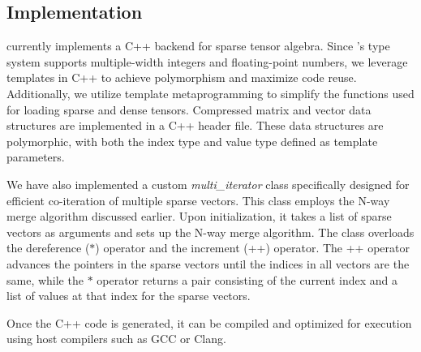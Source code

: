 \documentclass[acmsmall,nonacm]{acmart}\settopmatter{printfolios=true,printccs=false,printacmref=false}
\newcommand{\rhyme}{\text{Rhyme}\xspace}
\begin{document}
\subsection*{Implementation}

\rhyme currently implements a C++ backend for sparse tensor algebra. Since \rhyme's type system supports multiple-width integers and floating-point numbers, we leverage templates in C++ to achieve polymorphism and maximize code reuse. Additionally, we utilize template metaprogramming to simplify the functions used for loading sparse and dense tensors. Compressed matrix and vector data structures are implemented in a C++ header file. These data structures are polymorphic, with both the index type and value type defined as template parameters.\par
We have also implemented a custom \emph{multi\_iterator} class specifically designed for efficient co-iteration of multiple sparse vectors. This class employs the N-way merge algorithm discussed earlier. Upon initialization, it takes a list of sparse vectors as arguments and sets up the N-way merge algorithm. The class overloads the dereference ($\ast$) operator and the increment (++) operator. The ++ operator advances the pointers in the sparse vectors until the indices in all vectors are the same, while the $\ast$ operator returns a pair consisting of the current index and a list of values at that index for the sparse vectors.\par
Once the C++ code is generated, it can be compiled and optimized for execution using host compilers such as GCC or Clang.
\end{document}
